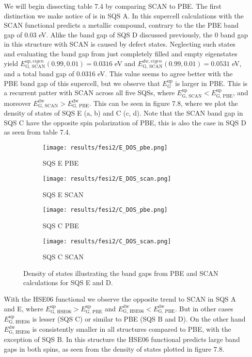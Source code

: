 We will begin dissecting table 7.4 by comparing SCAN to PBE. The first distinction we make notice of is in SQS A. In this supercell calculations with the SCAN functional predicts a metallic compound, contrary to the the PBE band gap of 0.03 eV. Alike the band gap of SQS D discussed previously, the 0 band gap in this structure with SCAN is caused by defect states. Neglecting such states and evaluating the band gap from just completely filled and empty eigenstates yield $E_\text{G, SCAN} ^{up, eigen}(0.99, 0.01) = 0.0316$ eV and $E_\text{G, SCAN} ^{dw, eigen}(0.99, 0.01) = 0.0531$ eV, and a total band gap of 0.0316 eV. This value seems to agree better with the PBE band gap of this supercell, but we observe that $E_G ^\text{up}$ is larger in PBE.  This is a recurrent patter with SCAN across all five SQSs, where $E_\text{G, SCAN} ^\text{up} < E_\text{G, PBE} ^\text{up}$, and moreover $E_\text{G, SCAN} ^\text{dw} > E_\text{G, PBE} ^\text{dw}$. This can be seen in figure 7.8, where we plot the density of states of SQS E (a, b) and C (c, d). Note that the SCAN band gap in SQS C have the opposite spin polarization of PBE, this is also the case in SQS D as seen from table 7.4.
\begin{figure}[H]
	\begin{subfigure}{.5\textwidth}
		\texttt{[image: results/fesi2/E\_DOS\_pbe.png]}
		\caption{SQS E PBE}
	\end{subfigure}
	\begin{subfigure}{.5\textwidth}
		\texttt{[image: results/fesi2/E\_DOS\_scan.png]}
		\caption{SQS E SCAN}
	\end{subfigure}
	\begin{subfigure}{.5\textwidth}
		\texttt{[image: results/fesi2/C\_DOS\_pbe.png]}
		\caption{SQS C PBE}
	\end{subfigure}
	\begin{subfigure}{.5\textwidth}
		\texttt{[image: results/fesi2/C\_DOS\_scan.png]}
		\caption{SQS C SCAN}
	\end{subfigure}
	\caption{Density of states illustrating the band gaps from PBE and SCAN calculations for SQS E and D.}
\end{figure}

With the HSE06 functional we observe the opposite trend to SCAN in SQS A and E, where $E_\text{G, HSE06} ^\text{up} > E_\text{G, PBE} ^\text{up}$ and $E_\text{G, HSE06} ^\text{dw} < E_\text{G, PBE} ^\text{dw}$. But in other cases $E_\text{G, HSE06} ^\text{up}$ is lesser (SQS C) or similar to PBE (SQS B and D). On the other hand $E_\text{G, HSE06} ^\text{dw}$ is consistently smaller in all structures compared to PBE, with the exception of SQS B. In this structure the HSE06 functional predicts large band gaps in both spins, as seen from the density of states plotted in figure 7.8.    
 
